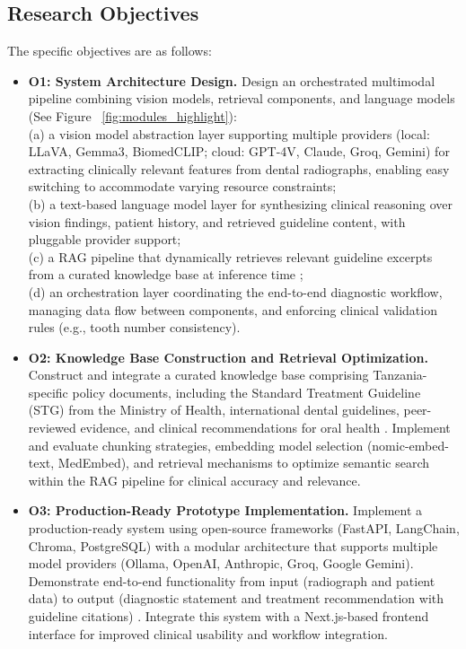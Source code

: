 \documentclass[12pt,a4paper]{report}
\begin{document}
	\subsection{Research Objectives}
	The specific objectives are as follows:
	
	\begin{itemize}
		\item \textbf{O1: System Architecture Design.} Design an orchestrated multimodal pipeline combining vision models, retrieval components, and language models  (See Figure ~\ref{fig:modules_highlight}): \\
		(a) a vision model abstraction layer supporting multiple providers (local: LLaVA, Gemma3, BiomedCLIP; cloud: GPT-4V, Claude, Groq, Gemini) for extracting clinically relevant features from dental radiographs, enabling easy switching to accommodate varying resource constraints; \\
		(b) a text-based language model layer for synthesizing clinical reasoning over vision findings, patient history, and retrieved guideline content, with pluggable provider support; \\
		(c) a RAG pipeline that dynamically retrieves relevant guideline excerpts from a curated knowledge base at inference time \cite{lewis2020retrieval,huang2023multimodal}; \\
		(d) an orchestration layer coordinating the end-to-end diagnostic workflow, managing data flow between components, and enforcing clinical validation rules (e.g., tooth number consistency). 
		
		
		\item \textbf{O2: Knowledge Base Construction and Retrieval Optimization.} Construct and integrate a curated knowledge base comprising Tanzania-specific policy documents, including the Standard Treatment Guideline (STG) from the Ministry of Health, international dental guidelines, peer-reviewed evidence, and clinical recommendations for oral health \cite{world2024global,Edward2024OralHealthTZ,tanzania_oral_health_policy}. Implement and evaluate chunking strategies, embedding model selection (nomic-embed-text, MedEmbed), and retrieval mechanisms to optimize semantic search within the RAG pipeline for clinical accuracy and relevance.
		
		\item \textbf{O3: Production-Ready Prototype Implementation.} Implement a production-ready  system using open-source frameworks (FastAPI, LangChain, Chroma, PostgreSQL) with a modular architecture that supports multiple model providers (Ollama, OpenAI, Anthropic, Groq, Google Gemini). Demonstrate end-to-end functionality from input (radiograph and patient data) to output (diagnostic statement and treatment recommendation with guideline citations) \cite{lewis2020retrieval,litjens2017survey}. Integrate this system with a Next.js-based frontend interface for improved clinical usability and workflow integration.
		

\end{itemize}
\end{document}
